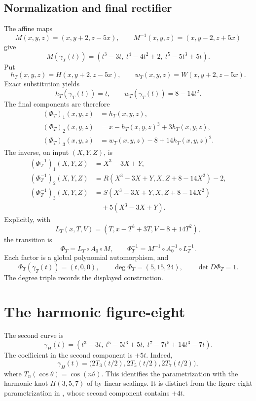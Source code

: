 \documentclass[11pt,a4paper]{article}
\newcommand{\comp}{\circ}
\begin{document}
\subsection{Normalization and final rectifier}

The affine maps
\[
M(x,y,z)=(x,y+2,z-5x),\qquad M^{-1}(x,y,z)=(x,y-2,z+5x)
\]
give
\[
M(\gamma_T(t))=(t^3-3t,\ t^4-4t^2+2,\ t^5-5t^3+5t).
\]
Put
\[
h_T(x,y,z)=H(x,y+2,z-5x),\qquad
w_T(x,y,z)=W(x,y+2,z-5x).
\]
Exact substitution yields
\[
h_T(\gamma_T(t))=t,\qquad w_T(\gamma_T(t))=8-14t^2.
\]
The final components are therefore
\begin{equation}\label{eq:PhiT}
\begin{aligned}
(\Phi_T)_1(x,y,z)&=h_T(x,y,z),\\
(\Phi_T)_2(x,y,z)&=x-h_T(x,y,z)^3+3h_T(x,y,z),\\
(\Phi_T)_3(x,y,z)&=w_T(x,y,z)-8+14h_T(x,y,z)^2.
\end{aligned}
\end{equation}
The inverse, on input $(X,Y,Z)$, is
\begin{equation}\label{eq:PhiTinv}
\begin{aligned}
(\Phi_T^{-1})_1(X,Y,Z)&=X^3-3X+Y,\\
(\Phi_T^{-1})_2(X,Y,Z)&=R(X^3-3X+Y,X,Z+8-14X^2)-2,\\
(\Phi_T^{-1})_3(X,Y,Z)&=S(X^3-3X+Y,X,Z+8-14X^2)\\
&\quad+5(X^3-3X+Y).
\end{aligned}
\end{equation}
Explicitly, with
\[
L_T(x,T,V)=(T,x-T^3+3T,V-8+14T^2),
\]
the transition is
\[
\boxed{\Phi_T=L_T\comp A_0\comp M,\qquad
\Phi_T^{-1}=M^{-1}\comp A_0^{-1}\comp L_T^{-1}.}
\]
Each factor is a global polynomial automorphism, and
\begin{equation}\label{eq:trefoil-result}
\boxed{\Phi_T(\gamma_T(t))=(t,0,0),\qquad
\deg\Phi_T=(5,15,24),\qquad \det D\Phi_T=1.}
\end{equation}
The degree triple records the displayed construction.

\clearpage


\clearpage
\section{The harmonic figure-eight}

The second curve is
\begin{equation}\label{eq:harmonic}
\gamma_H(t)=
(t^3-3t,\ t^5-5t^3+5t,\ t^7-7t^5+14t^3-7t).
\end{equation}
The coefficient in the second component is $+5t$.
Indeed,
\[
\gamma_H(t)=\bigl(2T_3(t/2),2T_5(t/2),2T_7(t/2)\bigr),
\]
where $T_n(\cos\theta)=\cos(n\theta)$. This identifies the parametrization
with the harmonic knot $H(3,5,7)$ of \cite{KP} by linear scalings.
It is distinct from the figure-eight parametrization in
\cite[\S3, Example~2]{Shastri}, whose second component contains $+4t$.
\end{document}
